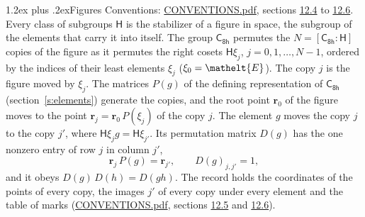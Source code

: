 \documentclass[10pt,a4paper]{article}
\makeatletter
\renewcommand\section{\@startsection{section}{1}{\z@}{-3ex plus -1ex minus -.2ex}%
  {1.2ex plus .2ex}{\normalfont\large\sffamily\bfseries\color{parttitle}}}
\numberwithin{equation}{section}
\newcommand{\eltfont}[1]{{\let\sigma\eltsigma\mathelt{#1}}}
\newcommand{\grp}[1]{\mathsf{#1}}
\newcommand{\cls}[1]{\eltfont{#1}}
\newcommand{\pointr}{\mathbf{r}}
\makeatother
\begin{document}
\section{Figures}\label{s:permutation}
Conventions: \href{../../CONVENTIONS.pdf}{CONVENTIONS.pdf}, sections \href{../../CONVENTIONS.pdf\#conv.12.4}{12.4} to \href{../../CONVENTIONS.pdf\#conv.12.6}{12.6}.
Every class of subgroups $\grp{H}$ is the stabilizer of a figure in space, the subgroup of the elements that carry it into itself. \label{n:local.orbit.size}\label{n:element.coset.least}\label{n:index.coset}The group $\grp{C_{8h}}$ permutes the $N = [\grp{C_{8h}} : \grp{H}]$ copies of the figure as it permutes the right cosets $\grp{H}\xi_j$, $j = 0, 1, \dots, N - 1$, ordered by the indices of their least elements $\xi_j$ ($\xi_0 = \cls{E}$). The copy $j$ is the figure moved by $\xi_j$. The matrices $P(g)$ of the defining representation of $\grp{C_{8h}}$ (section~\ref{s:elements}) generate the copies, and the root point $\pointr_0$ of the figure moves to the point $\pointr_j = \pointr_0\, P(\xi_j)$ of the copy $j$. \label{n:local.coset.image}The element $g$ moves the copy $j$ to the copy $j'$, where $\grp{H}\xi_j g = \grp{H}\xi_{j'}$. \label{n:local.matrix.permutation}Its permutation matrix $D(g)$ has the one nonzero entry of row $j$ in column $j'$,
\begin{equation}\label{e:perm.matrix}\pointr_j\, P(g) = \pointr_{j'}, \qquad D(g)_{j,j'} = 1,\end{equation}
and it obeys $D(g)\, D(h) = D(gh)$. The record holds the coordinates of the points of every copy, the images $j'$ of every copy under every element and the table of marks (\href{../../CONVENTIONS.pdf}{CONVENTIONS.pdf}, sections \href{../../CONVENTIONS.pdf\#conv.12.5}{12.5} and \href{../../CONVENTIONS.pdf\#conv.12.6}{12.6}).
\end{document}
